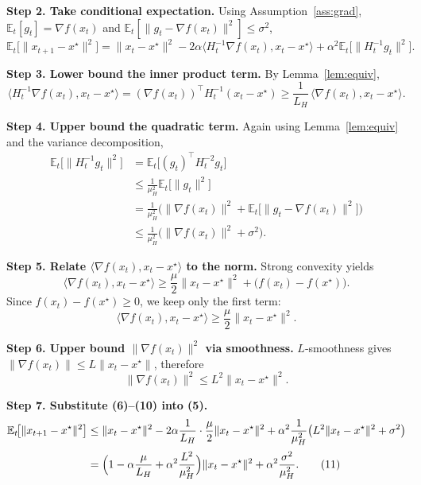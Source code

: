 \documentclass{article}
\newcommand{\E}{\mathbb{E}}
\begin{document}
\noindent\textbf{Step 2. Take conditional expectation.}  
Using Assumption~\ref{ass:grad}, $\E_t[g_t]=\nabla f(x_t)$ and $\E_t[\|g_t-\nabla f(x_t)\|^{2}]\le\sigma^{2}$,
\[
\E_t\big[\|x_{t+1}-x^{\star}\|^{2}\big]
= \|x_t-x^{\star}\|^{2}
-2\alpha\langle H_t^{-1}\nabla f(x_t),x_t-x^{\star}\rangle
+\alpha^{2}\E_t\!\big[\|H_t^{-1}g_t\|^{2}\big]. \tag{5}
\]

\noindent\textbf{Step 3. Lower bound the inner product term.}  
By Lemma~\ref{lem:equiv},
\[
\langle H_t^{-1}\nabla f(x_t),x_t-x^{\star}\rangle
= (\nabla f(x_t))^{\!\top} H_t^{-1}(x_t-x^{\star})
\ge \frac{1}{L_H}\,\langle\nabla f(x_t),x_t-x^{\star}\rangle . \tag{6}
\]

\noindent\textbf{Step 4. Upper bound the quadratic term.}  
Again using Lemma~\ref{lem:equiv} and the variance decomposition,
\[
\begin{aligned}
\E_t\!\big[\|H_t^{-1}g_t\|^{2}\big]
&= \E_t\!\big[(g_t)^{\!\top}H_t^{-2}g_t\big]                                   \\[0.2em]
&\le \frac{1}{\mu_H^{2}}\E_t\!\big[\|g_t\|^{2}\big]                              \\[0.2em]
&= \frac{1}{\mu_H^{2}}\Big(\|\nabla f(x_t)\|^{2}
      +\E_t\!\big[\|g_t-\nabla f(x_t)\|^{2}\big]\Big)                           \\[0.2em]
&\le \frac{1}{\mu_H^{2}}\big(\|\nabla f(x_t)\|^{2}+\sigma^{2}\big).            \tag{7}
\end{aligned}
\]

\noindent\textbf{Step 5. Relate $\langle\nabla f(x_t),x_t-x^{\star}\rangle$ to the norm.}  
Strong convexity yields
\[
\langle\nabla f(x_t),x_t-x^{\star}\rangle
\ge \frac{\mu}{2}\|x_t-x^{\star}\|^{2} + \bigl(f(x_t)-f(x^{\star})\bigr). \tag{8}
\]
Since $f(x_t)-f(x^{\star})\ge 0$, we keep only the first term:
\[
\langle\nabla f(x_t),x_t-x^{\star}\rangle \ge \frac{\mu}{2}\|x_t-x^{\star}\|^{2}. \tag{9}
\]

\noindent\textbf{Step 6. Upper bound $\|\nabla f(x_t)\|^{2}$ via smoothness.}  
$L$‑smoothness gives $\|\nabla f(x_t)\| \le L\|x_t-x^{\star}\|$, therefore
\[
\|\nabla f(x_t)\|^{2}\le L^{2}\|x_t-x^{\star}\|^{2}. \tag{10}
\]

\noindent\textbf{Step 7. Substitute (6)–(10) into (5).}  
\[
\begin{aligned}
\E_t\!\big[\|x_{t+1}-x^{\star}\|^{2}\big]
&\le \|x_t-x^{\star}\|^{2}
-2\alpha\frac{1}{L_H}\cdot\frac{\mu}{2}\|x_t-x^{\star}\|^{2}
+\alpha^{2}\frac{1}{\mu_H^{2}}\big(L^{2}\|x_t-x^{\star}\|^{2}+\sigma^{2}\big) \\[0.2em]
&= \Bigl(1-\alpha\frac{\mu}{L_H}+\alpha^{2}\frac{L^{2}}{\mu_H^{2}}\Bigr)\|x_t-x^{\star}\|^{2}
   +\alpha^{2}\frac{\sigma^{2}}{\mu_H^{2}}.                              \tag{11}
\end{aligned}
\]
\end{document}
